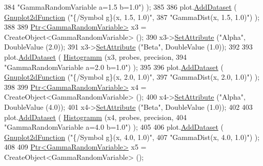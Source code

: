 \begin{DoxyCode}
384                                   \textcolor{stringliteral}{"GammaRandomVariable a=1.5 b=1.0"}) );
385 
386     plot.\hyperlink{classns3_1_1Gnuplot_a306ec724a327cf9ab699700f31fca0a1}{AddDataset} ( \hyperlink{classns3_1_1Gnuplot2dFunction}{Gnuplot2dFunction} (\textcolor{stringliteral}{"\{/Symbol g\}(x, 1.5, 1.0)"},
387                                          \textcolor{stringliteral}{"GammaDist(x, 1.5, 1.0)"}) );
388 
389     \hyperlink{classns3_1_1Ptr}{Ptr<GammaRandomVariable>} x3 = CreateObject<GammaRandomVariable> ();
390     x3->\hyperlink{classns3_1_1ObjectBase_ac60245d3ea4123bbc9b1d391f1f6592f}{SetAttribute} (\textcolor{stringliteral}{"Alpha"}, DoubleValue (2.0));
391     x3->\hyperlink{classns3_1_1ObjectBase_ac60245d3ea4123bbc9b1d391f1f6592f}{SetAttribute} (\textcolor{stringliteral}{"Beta"}, DoubleValue (1.0));
392 
393     plot.\hyperlink{classns3_1_1Gnuplot_a306ec724a327cf9ab699700f31fca0a1}{AddDataset} ( \hyperlink{main-random-variable_8cc_a2cfd3837ab3f2e816cf53486d7a186b5}{Histogramm} (x3, probes, precision,
394                                   \textcolor{stringliteral}{"GammaRandomVariable a=2.0 b=1.0"}) );
395 
396     plot.\hyperlink{classns3_1_1Gnuplot_a306ec724a327cf9ab699700f31fca0a1}{AddDataset} ( \hyperlink{classns3_1_1Gnuplot2dFunction}{Gnuplot2dFunction} (\textcolor{stringliteral}{"\{/Symbol g\}(x, 2.0, 1.0)"},
397                                          \textcolor{stringliteral}{"GammaDist(x, 2.0, 1.0)"}) );
398 
399     \hyperlink{classns3_1_1Ptr}{Ptr<GammaRandomVariable>} x4 = CreateObject<GammaRandomVariable> ();
400     x4->\hyperlink{classns3_1_1ObjectBase_ac60245d3ea4123bbc9b1d391f1f6592f}{SetAttribute} (\textcolor{stringliteral}{"Alpha"}, DoubleValue (4.0));
401     x4->\hyperlink{classns3_1_1ObjectBase_ac60245d3ea4123bbc9b1d391f1f6592f}{SetAttribute} (\textcolor{stringliteral}{"Beta"}, DoubleValue (1.0));
402 
403     plot.\hyperlink{classns3_1_1Gnuplot_a306ec724a327cf9ab699700f31fca0a1}{AddDataset} ( \hyperlink{main-random-variable_8cc_a2cfd3837ab3f2e816cf53486d7a186b5}{Histogramm} (x4, probes, precision,
404                                   \textcolor{stringliteral}{"GammaRandomVariable a=4.0 b=1.0"}) );
405 
406     plot.\hyperlink{classns3_1_1Gnuplot_a306ec724a327cf9ab699700f31fca0a1}{AddDataset} ( \hyperlink{classns3_1_1Gnuplot2dFunction}{Gnuplot2dFunction} (\textcolor{stringliteral}{"\{/Symbol g\}(x, 4.0, 1.0)"},
407                                          \textcolor{stringliteral}{"GammaDist(x, 4.0, 1.0)"}) );
408 
409     \hyperlink{classns3_1_1Ptr}{Ptr<GammaRandomVariable>} x5 = CreateObject<GammaRandomVariable> ();

\end{DoxyCode}
